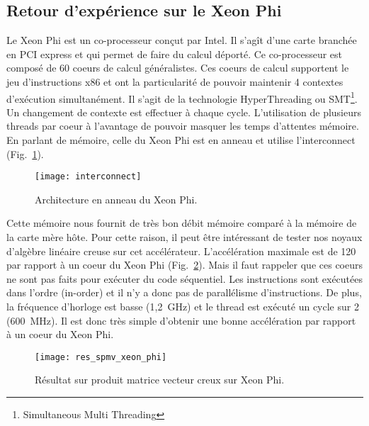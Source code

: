 \subsection{Retour d'expérience sur le Xeon Phi}
Le Xeon Phi est un co-processeur conçut par Intel.
%
Il s'agît d'une carte branchée en PCI express et qui permet de faire du calcul déporté.
%
Ce co-processeur est composé de 60 coeurs de calcul généralistes.
%
Ces coeurs de calcul supportent le jeu d'instructions x86 et ont la particularité de pouvoir maintenir 4 contextes d'exécution simultanément.
%
Il s'agit de la technologie HyperThreading ou SMT\footnote{Simultaneous Multi Threading}.
%
Un changement de contexte est effectuer à chaque cycle.
%
L'utilisation de plusieurs threads par coeur à l'avantage de pouvoir masquer les temps d'attentes mémoire.
%
En parlant de mémoire, celle du Xeon Phi est en anneau et utilise l'interconnect (Fig.~\ref{fig:interconnect}).

\begin{figure}[t!]
  \centering
  \texttt{[image: interconnect]}
  \caption{Architecture en anneau du Xeon Phi.}
  \label{fig:interconnect}
\end{figure}


Cette mémoire nous fournit de très bon débit mémoire comparé à la mémoire de la carte mère hôte.
%
Pour cette raison, il peut être intéressant de tester nos noyaux d'algèbre linéaire creuse sur cet accélérateur.
%
L'accélération maximale est de 120 par rapport à un coeur du Xeon Phi (Fig.~\ref{fig:res_spmv_xeon_phi}).
%
Mais il faut rappeler que ces coeurs ne sont pas faits pour exécuter du code séquentiel.
%
Les instructions sont exécutées dans l'ordre (in-order) et il n'y a donc pas de parallélisme d'instructions.
%
De plus, la fréquence d'horloge est basse (1,2~GHz) et le thread est exécuté un cycle sur 2 (600~MHz).
%
Il est donc très simple d'obtenir une bonne accélération par rapport à un coeur du Xeon Phi.

\begin{figure}[t!]
  \centering
  \texttt{[image: res\_spmv\_xeon\_phi]}
  \caption{Résultat sur produit matrice vecteur creux sur Xeon Phi.}
  \label{fig:res_spmv_xeon_phi}
\end{figure}



